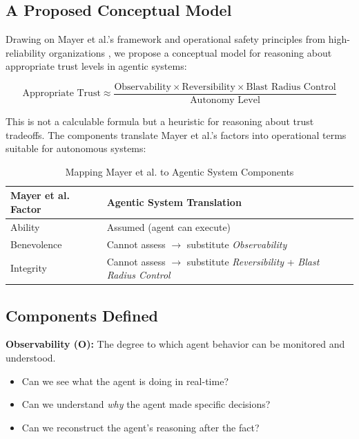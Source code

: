 \subsection{A Proposed Conceptual Model}
\label{subsec:conceptual-model}

Drawing on Mayer et al.'s framework and operational safety principles from high-reliability organizations \citep{weick2007}, we propose a conceptual model for reasoning about appropriate trust levels in agentic systems:

\begin{equation}
\text{Appropriate Trust} \approx \frac{\text{Observability} \times \text{Reversibility} \times \text{Blast Radius Control}}{\text{Autonomy Level}}
\end{equation}

This is not a calculable formula but a heuristic for reasoning about trust tradeoffs. The components translate Mayer et al.'s factors into operational terms suitable for autonomous systems:

\begin{table}[htbp]
\centering
\caption{Mapping Mayer et al. to Agentic System Components}
\label{tab:mayer-mapping}
\begin{tabular}{ll}
\toprule
\textbf{Mayer et al. Factor} & \textbf{Agentic System Translation} \\
\midrule
Ability & Assumed (agent can execute) \\
Benevolence & Cannot assess $\rightarrow$ substitute \textit{Observability} \\
Integrity & Cannot assess $\rightarrow$ substitute \textit{Reversibility} + \textit{Blast Radius Control} \\
\bottomrule
\end{tabular}
\end{table}

\subsection{Components Defined}
\label{subsec:components-defined}

\textbf{Observability (O):} The degree to which agent behavior can be monitored and understood.
\begin{itemize}
    \item Can we see what the agent is doing in real-time?
    \item Can we understand \textit{why} the agent made specific decisions?
    \item Can we reconstruct the agent's reasoning after the fact?
\end{itemize}

